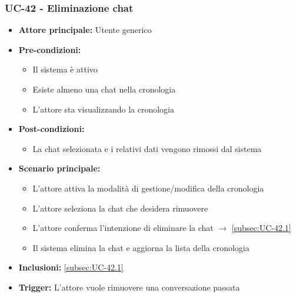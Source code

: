 \documentclass[a4paper,12pt]{article}
\begin{document}
\subsubsection{UC-42 - Eliminazione chat} \label{subsec:UC-42}
\begin{itemize}
    \item \textbf{Attore principale:} Utente generico
    \item \textbf{Pre-condizioni:}
    \begin{itemize}
        \item Il sistema è attivo
        \item Esiste almeno una chat nella cronologia
        \item L'attore sta visualizzando la cronologia
    \end{itemize}
    \item \textbf{Post-condizioni:} 
    \begin{itemize}
        \item La chat selezionata e i relativi dati vengono rimossi dal sistema
    \end{itemize}
    \item \textbf{Scenario principale:} 
    \begin{itemize}
        \item L'attore attiva la modalità di gestione/modifica della cronologia
        \item L'attore seleziona la chat che desidera rimuovere
        \item L'attore conferma l'intenzione di eliminare la chat $\rightarrow$ \ref{subsec:UC-42.1}
        \item Il sistema elimina la chat e aggiorna la lista della cronologia
    \end{itemize}
    \item \textbf{Inclusioni:} \ref{subsec:UC-42.1}
    \item \textbf{Trigger:} L'attore vuole rimuovere una conversazione passata
\end{itemize}
\end{document}
